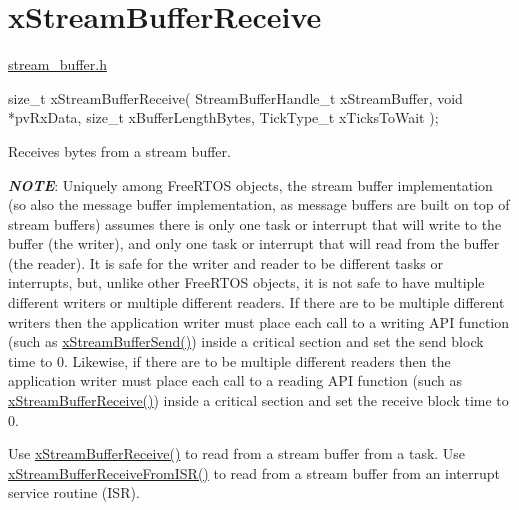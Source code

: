 \hypertarget{group__x_stream_buffer_receive}{}\section{x\+Stream\+Buffer\+Receive}
\label{group__x_stream_buffer_receive}
\hyperlink{stream__buffer_8h}{stream\+\_\+buffer.\+h}


\begin{DoxyPre}
size\_t xStreamBufferReceive( StreamBufferHandle\_t xStreamBuffer,
                          void *pvRxData,
                          size\_t xBufferLengthBytes,
                          TickType\_t xTicksToWait );
\end{DoxyPre}


Receives bytes from a stream buffer.

{\itshape {\bfseries N\+O\+TE}}\+: Uniquely among Free\+R\+T\+OS objects, the stream buffer implementation (so also the message buffer implementation, as message buffers are built on top of stream buffers) assumes there is only one task or interrupt that will write to the buffer (the writer), and only one task or interrupt that will read from the buffer (the reader). It is safe for the writer and reader to be different tasks or interrupts, but, unlike other Free\+R\+T\+OS objects, it is not safe to have multiple different writers or multiple different readers. If there are to be multiple different writers then the application writer must place each call to a writing A\+PI function (such as \hyperlink{stream__buffer_8h_a35cdf3b6bf677086b9128782f762499d}{x\+Stream\+Buffer\+Send()}) inside a critical section and set the send block time to 0. Likewise, if there are to be multiple different readers then the application writer must place each call to a reading A\+PI function (such as \hyperlink{stream__buffer_8h_a55efc144b988598d84a6087d3e20b507}{x\+Stream\+Buffer\+Receive()}) inside a critical section and set the receive block time to 0.

Use \hyperlink{stream__buffer_8h_a55efc144b988598d84a6087d3e20b507}{x\+Stream\+Buffer\+Receive()} to read from a stream buffer from a task. Use \hyperlink{stream__buffer_8h_a6c882a1d9f26c40f93f271bd1b844b3b}{x\+Stream\+Buffer\+Receive\+From\+I\+S\+R()} to read from a stream buffer from an interrupt service routine (I\+SR).


